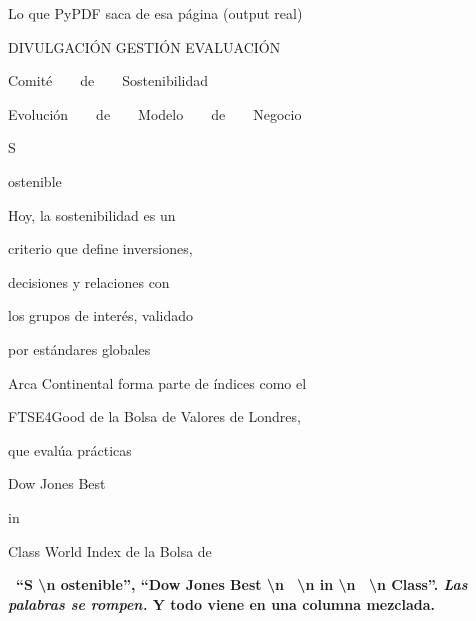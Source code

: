 \documentclass[aspectratio=169, 11pt]{beamer}
\begin{document}
\begin{frame}{Lo que PyPDF saca de esa página (output real)}
  \vspace{2pt}
  \begin{tcolorbox}[colback=arcaGray, colframe=arcaRed, leftrule=3pt,
    boxrule=0pt, sharp corners, left=8pt, right=8pt, top=4pt, bottom=4pt,
    title={\scriptsize\color{white}\bfseries\ttfamily PdfReader("reporte\textunderscore arca.pdf").pages[43].extract\textunderscore text()},
    coltitle=white, colbacktitle=arcaRed, fonttitle=\scriptsize]
    {\scriptsize\color{textDark}\ttfamily
    DIVULGACIÓN GESTIÓN EVALUACIÓN\par
    Comité~~~~de~~~~Sostenibilidad\par
    Evolución~~~~de~~~~Modelo~~~~de~~~~Negocio\par
    S\par
    ostenible\par
    Hoy, la sostenibilidad es un\par
    criterio que define inversiones,\par
    decisiones y relaciones con\par
    los grupos de interés, validado\par
    por estándares globales\par
    Arca Continental forma parte de índices como el\par
    FTSE4Good de la Bolsa de Valores de Londres,\par
    que evalúa prácticas\par
    Dow Jones Best\par
    {\color{arcaRed}\bfseries\textperiodcentered}\par
    in\par
    {\color{arcaRed}\bfseries\textperiodcentered}\par
    Class World Index de la Bolsa de\par}
  \end{tcolorbox}
  \vspace{6pt}
  \begin{tcolorbox}[colback=arcaRed!8, colframe=arcaRed, leftrule=3pt,
    boxrule=0pt, sharp corners, left=8pt, right=8pt, top=3pt, bottom=3pt]
    {\footnotesize\color{arcaDark}\bfseries
    \faExclamationTriangle~``S \textbackslash n ostenible'', ``Dow Jones Best \textbackslash n \textperiodcentered\
    \textbackslash n in \textbackslash n \textperiodcentered\ \textbackslash n Class''. \emph{Las palabras se rompen.}
    Y todo viene en una columna mezclada.}
  \end{tcolorbox}
\end{frame}
\end{document}
